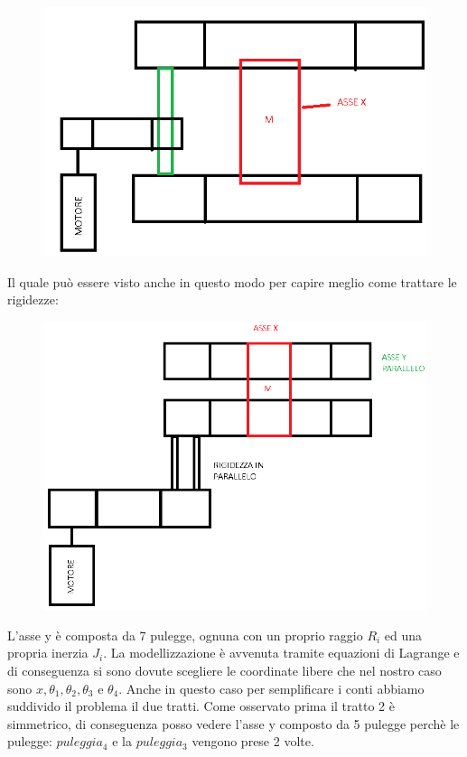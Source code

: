 \documentclass{article}
\begin{document}
\begin{figure}[H]
\centering
\includegraphics[width=.6\textwidth]{./assey/assey_nf.png}
\end{figure}
Il quale può essere visto anche in questo modo per capire meglio come trattare le rigidezze:
\begin{figure}[H]
\centering
\includegraphics[width=.6\textwidth]{./assey/assey_nfm.png}
\end{figure}
L'asse y è composta da 7 pulegge, ognuna con un proprio raggio $R_{i}$ ed una propria inerzia $J_{i}$. La modellizzazione è avvenuta tramite equazioni di Lagrange e di conseguenza si sono dovute scegliere le coordinate libere che nel nostro caso sono $x,\theta_{1},\theta_{2},\theta_{3} $ e $ \theta_4$. Anche in questo caso per semplificare i conti abbiamo suddivido il problema il due tratti. Come osservato prima il tratto 2 è simmetrico, di conseguenza posso vedere l'asse y composto da 5 pulegge perchè le pulegge: $puleggia_{4}$ e la $puleggia_{3}$ vengono prese 2 volte.
\end{document}
